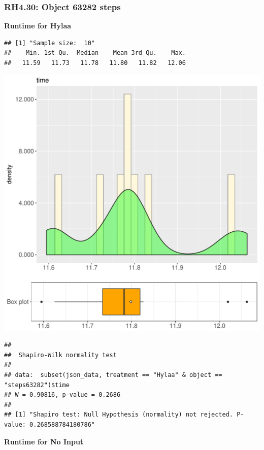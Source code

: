 \documentclass{article}\usepackage[]{graphicx}\usepackage[]{color}
\makeatletter
\def\maxwidth{ %
  \ifdim\Gin@nat@width>\linewidth
    \linewidth
  \else
    \Gin@nat@width
  \fi
}
\newenvironment{kframe}{%
 \def\at@end@of@kframe{}%
 \ifinner\ifhmode%
  \def\at@end@of@kframe{\end{minipage}}%
  \begin{minipage}{\columnwidth}%
 \fi\fi%
 \def\FrameCommand##1{\hskip\@totalleftmargin \hskip-\fboxsep
 \colorbox{shadecolor}{##1}\hskip-\fboxsep
     \hskip-\linewidth \hskip-\@totalleftmargin \hskip\columnwidth}%
 \MakeFramed {\advance\hsize-\width
   \@totalleftmargin\z@ \linewidth\hsize
   \@setminipage}}%
 {\par\unskip\endMakeFramed%
 \at@end@of@kframe}
\newenvironment{knitrout}{}{} %
\makeatother
\begin{document}
\subsubsection{RH4.30: Object 63282 steps}

 \textbf{Runtime for Hylaa}
\begin{knitrout}
\color{fgcolor}\begin{kframe}
\begin{verbatim}
## [1] "Sample size:  10"
##    Min. 1st Qu.  Median    Mean 3rd Qu.    Max. 
##   11.59   11.73   11.78   11.80   11.82   12.06
\end{verbatim}
\end{kframe}
\includegraphics[width=\maxwidth]{figure/RH4_Hylaa_steps63282-1} 
\begin{kframe}\begin{verbatim}
## 
## 	Shapiro-Wilk normality test
## 
## data:  subset(json_data, treatment == "Hylaa" & object == "steps63282")$time
## W = 0.90816, p-value = 0.2686
## 
## [1] "Shapiro test: Null Hypothesis (normality) not rejected. P-value: 0.268588784180786"
\end{verbatim}
\end{kframe}
\end{knitrout}
 \textbf{Runtime for No Input}
\end{document}
